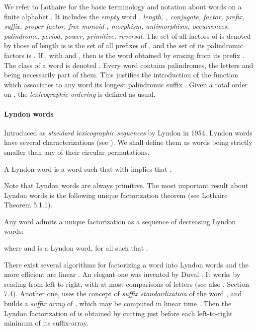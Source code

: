 We refer to Lothaire \cite{lothaire1} for the basic terminology and notation about words on a finite alphabet . It includes  the {\it empty} word , {\it length, , conjugate, factor, prefix, suffix, proper factor,  free monoid ,  morphism, antimorphism, occurrences, palindrome, period, power, primitive, reversal}.
The set of all factors of  is denoted by    those of
length   is   is
the set of all prefixes of , and  the set of its palindromic factors is .  If , with  and , then 
 is the word obtained by erasing from  its prefix .
The  class of a word  is denoted . Every  word contains palindromes, the letters and  being necessarily part of them. This justifies the introduction of the function  which associates  to any  word   its longest palindromic suffix .
Given a  total order  on , the \emph{lexicographic ordering} is defined as usual. 
\paragraph{Lyndon words}
Introduced as \emph{standard lexicographic sequences} by Lyndon in 1954, Lyndon words have several characterizations (see \cite{lothaire1}). We shall define them as words being strictly smaller than any of their circular permutations. 
\begin{definition}
A Lyndon word  is a word such that  with  implies that . 
\end{definition}

Note that Lyndon words are always primitive. The most important result about Lyndon words is the following unique factorization theorem (see Lothaire \cite{lothaire1} Theorem 5.1.1).
\begin{theorem}  Any word   admits a unique factorization as a sequence of decreasing Lyndon words:

where   and  is a Lyndon word, for all  such that . 
\end{theorem}
There exist several algorithms for factorizing a word  into Lyndon words and the more efficient are linear . 
An  elegant one was invented by Duval \cite{Duv}. It works by reading from left to right, with at most  comparisons of letters (see also \cite{Reu}, Section 7.4). 
Another one, uses the concept of \emph{suffix standardization} of the word , and builds a \emph{suffix array} of , which may be computed in linear time \cite{CroHanLec}. Then the Lyndon factorization of  is obtained by cutting  just before each left-to-right minimum of its suffix-array.





